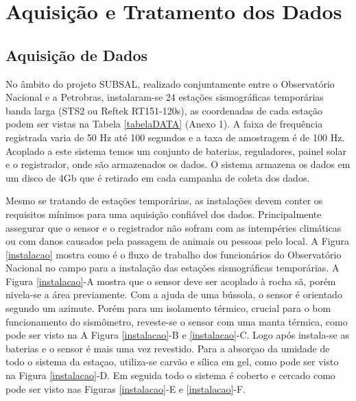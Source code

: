 \chapter{Aquisição e Tratamento dos Dados}
\section{Aquisição de Dados}

No âmbito do projeto SUBSAL, realizado conjuntamente entre o Observatório Nacional e a Petrobras,  instalaram-se 24 estações sismográficas temporárias banda larga (STS2 ou Reftek RT151-120s), as coordenadas de cada estação podem ser vistas na Tabela \ref{tabelaDATA} (Anexo 1). A faixa de frequência registrada varia de 50 Hz até 100 segundos e a taxa de amostragem é de 100 Hz. Acoplado a este sistema temos um conjunto de baterias, reguladores, painel solar e o registrador, onde são armazenados os dados. O sistema armazena os dados em um disco de 4Gb que é retirado em cada campanha de coleta dos dados.

Mesmo se tratando de estações temporárias, as instalações devem conter os requisitos mínimos para uma aquisição confiável dos dados. Principalmente assegurar que o sensor e o registrador não sofram com as intempéries climáticas ou com danos causados pela passagem de animais ou pessoas pelo local. A Figura \ref{instalacao} mostra como é o fluxo de trabalho dos funcionários do Observatório Nacional no campo para a instalação das estações sismográficas temporárias. A Figura \ref{instalacao}-A mostra que o sensor deve ser acoplado à rocha sã, porém nivela-se a área previamente. Com a ajuda de uma bússola, o sensor é orientado segundo um azimute.  Porém para um isolamento térmico, crucial para o bom funcionamento do sismômetro, reveste-se o sensor com uma manta térmica, como pode ser visto na A Figura \ref{instalacao}-B e \ref{instalacao}-C. Logo após instala-se as baterias e o sensor é mais uma vez revestido. Para a absorçao da umidade de todo o sistema da estaçao, utiliza-se carvão e sílica em gel, como pode ser visto na Figura \ref{instalacao}-D. Em seguida todo o sistema é coberto e cercado como pode ser visto nas Figuras \ref{instalacao}-E e \ref{instalacao}-F.	  

